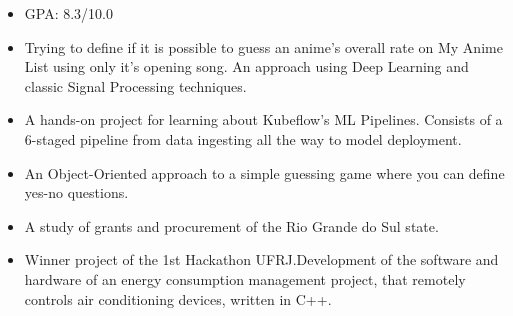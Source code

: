 \documentclass[10pt,a4paper,ragged2e,withhyper]{altacv}
\begin{document}
\begin{paracol}{2}
            \begin{itemize}
                \item GPA: 8.3/10.0
            \end{itemize}
        
            \begin{itemize}
                \item Trying to define if it is possible to guess an anime's overall rate on My Anime List using only it's opening song. An approach using Deep Learning and classic Signal Processing techniques.
            \end{itemize}
            \divider
            
            \begin{itemize}
                \item A hands-on project for learning about Kubeflow's ML Pipelines. Consists of a 6-staged pipeline from data ingesting all the way to model deployment.
            \end{itemize}
            \divider
            
            \begin{itemize}
                \item An Object-Oriented approach to a simple guessing game where you can define yes-no questions. 
            \end{itemize}
            \divider
            
            \begin{itemize}
                \item A study of grants and procurement of the Rio Grande do Sul state. 
            \end{itemize}
            \divider
            
            \begin{itemize}
                \item Winner project of the 1st Hackathon UFRJ.Development of the software and hardware of an energy consumption management project, that remotely controls air conditioning devices, written in C++.
            \end{itemize}
            \divider
            

\end{paracol}
\end{document}
